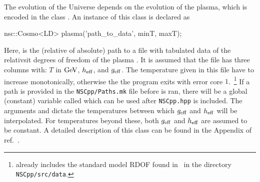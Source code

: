 \documentclass[11pt,a4paper]{article}
\begin{document}
The evolution of the Universe depends on the evolution of the plasma, which is encoded in the class . An instance of this class is declared as 
%
\begin{cpp}
	nsc::Cosmo<LD> plasma('path_to_data', minT, maxT);
\end{cpp}
%
Here,  is the (relative of absolute) path to a file with tabulated data  of the relativsit degrees of freedom of the plasma . It is assumed that the file has three columns with: $T$ in ${\rm GeV}$, $h_{\rm eff}{}$, and $g_{\rm eff}{}$. The temperature given in this file have to increase monotonically, otherwise the the program exits with error core $1$.~\footnote{\nsc already includes the standard model RDOF found in~\cite{Saikawa:2020swg} in the directory {\tt NSCpp/src/data}.} If a path is provided in the {\tt NSCpp/Paths.mk} file before  is ran, there will be a global (constant) variable called  which can be used after  {\tt NSCpp.hpp} is included.
%
The arguments  and  dictate the temperatures between which $g_{\rm eff}{}$ and $h_{\rm eff}{}$ will be interpolated. For temperatures beyond these, both  $g_{\rm eff}{}$ and $h_{\rm eff}{}$  are assumed to be constant. A detailed description of this class can be found in the Appendix of ref.~\cite{Karamitros:2021nxi}.  
\end{document}
